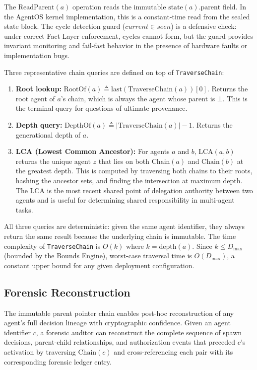 \bigskip
The $\text{ReadParent}(a)$ operation reads the immutable $\text{state}(a).\text{parent}$ field. In the AgentOS kernel implementation, this is a constant-time read from the sealed state block. The cycle detection guard ($current \in seen$) is a defensive check: under correct Fact Layer enforcement, cycles cannot form, but the guard provides invariant monitoring and fail-fast behavior in the presence of hardware faults or implementation bugs.

Three representative chain queries are defined on top of \texttt{TraverseChain}:

\begin{enumerate}
    \item \textbf{Root lookup:} $\text{RootOf}(a) \triangleq \text{last}(\text{TraverseChain}(a))[0]$. Returns the root agent of $a$'s chain, which is always the agent whose parent is $\bot$. This is the terminal query for questions of ultimate provenance.
    \item \textbf{Depth query:} $\text{DepthOf}(a) \triangleq |\text{TraverseChain}(a)| - 1$. Returns the generational depth of $a$.
    \item \textbf{LCA (Lowest Common Ancestor):} For agents $a$ and $b$, $\text{LCA}(a, b)$ returns the unique agent $z$ that lies on both $\text{Chain}(a)$ and $\text{Chain}(b)$ at the greatest depth. This is computed by traversing both chains to their roots, hashing the ancestor sets, and finding the intersection at maximum depth. The LCA is the most recent shared point of delegation authority between two agents and is useful for determining shared responsibility in multi-agent tasks.
\end{enumerate}

All three queries are deterministic: given the same agent identifier, they always return the same result because the underlying chain is immutable. The time complexity of \texttt{TraverseChain} is $O(k)$ where $k = \text{depth}(a)$. Since $k \leq D_{\max}$ (bounded by the Bounds Engine), worst-case traversal time is $O(D_{\max})$, a constant upper bound for any given deployment configuration.

\subsection{Forensic Reconstruction}\label{sec:forensic-reconstruction}

The immutable parent pointer chain enables post-hoc reconstruction of any agent's full decision lineage with cryptographic confidence. Given an agent identifier $c$, a forensic auditor can reconstruct the complete sequence of spawn decisions, parent-child relationships, and authorization events that preceded $c$'s activation by traversing $\text{Chain}(c)$ and cross-referencing each pair with its corresponding forensic ledger entry.

